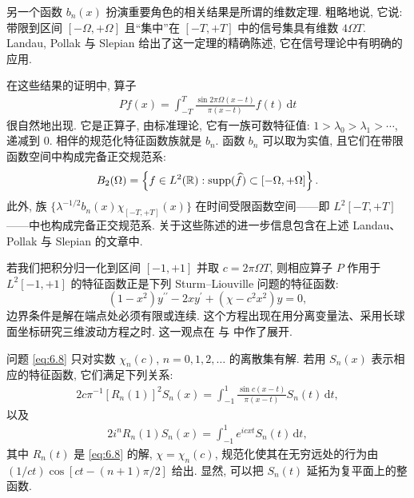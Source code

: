 另一个函数 $b_n(x)$ 扮演重要角色的相关结果是所谓的维数定理. 粗略地说, 它说: 带限到区间 $[-\Omega, +\Omega]$ 且``集中''在 $[-T, +T]$ 中的信号集具有维数 $4\Omega T$. Landau, Pollak 与 Slepian 给出了这一定理的精确陈述, 它在信号理论中有明确的应用.

在这些结果的证明中, 算子
\begin{align*}
  P f(x)=\int_{-T}^{T}\frac{\sin 2\pi\Omega(x-t)}{\pi(x-t)}f(t)\,\mathrm{d}t
\end{align*}
很自然地出现. 它是正算子, 由标准理论, 它有一族可数特征值: $1 > \lambda_0 > \lambda_1 > \cdots$, 递减到 $0$. 相伴的规范化特征函数族就是 $b_n$. 函数 $b_n$ 可以取为实值, 且它们在带限函数空间中构成完备正交规范系:
\begin{align*}
  B_{2}(\Omega)=\left\{f\in L^{2}(\mathbb{R}):\operatorname{supp}(\widehat{f})\subset[-\Omega,+\Omega]\right\}.
\end{align*}
此外, 族 $\{\lambda^{-1/2}b_n(x)\chi_{[-T,+T]}(x)\}$ 在时间受限函数空间——即 $L^2[-T,+T]$——中也构成完备正交规范系. 关于这些陈述的进一步信息包含在上述 Landau、Pollak 与 Slepian 的文章中.

若我们把积分归一化到区间 $[-1,+1]$ 并取 $c = 2\pi\Omega T$, 则相应算子 $P$ 作用于 $L^{2}[-1,+1]$ 的特征函数正是下列 Sturm--Liouville 问题的特征函数:
\begin{equation}\label{eq:6.8}
  \left(1-x^{2}\right)y^{\prime\prime}-2xy^{\prime}+\left(\chi-c^{2}x^{2}\right)y=0,
\end{equation}
边界条件是解在端点处必须有限或连续. 这个方程出现在用分离变量法、采用长球面坐标研究三维波动方程之时. 这一观点在 \cite{b136} 与 \cite{b144} 中作了展开.

问题 \eqref{eq:6.8} 只对实数 $\chi_n(c)$, $n = 0, 1, 2, \ldots$ 的离散集有解. 若用 $S_n(x)$ 表示相应的特征函数, 它们满足下列关系:
\begin{align*}
  2c\pi^{-1}\left[R_{n}(1)\right]^{2}S_{n}(x)=\int_{-1}^{1}\frac{\sin c(x-t)}{\pi(x-t)}S_{n}(t)\,\mathrm{d}t,
\end{align*}
以及
\begin{align*}
  2i^{n}R_{n}(1)S_{n}(x)=\int_{-1}^{1}e^{icxt}S_{n}(t)\,\mathrm{d}t,
\end{align*}
其中 $R_n(t)$ 是 \eqref{eq:6.8} 的解, $\chi = \chi_n(c)$, 规范化使其在无穷远处的行为由 $(1/ct)\cos[ct - (n+1)\pi/2]$ 给出. 显然, 可以把 $S_n(t)$ 延拓为复平面上的整函数.

